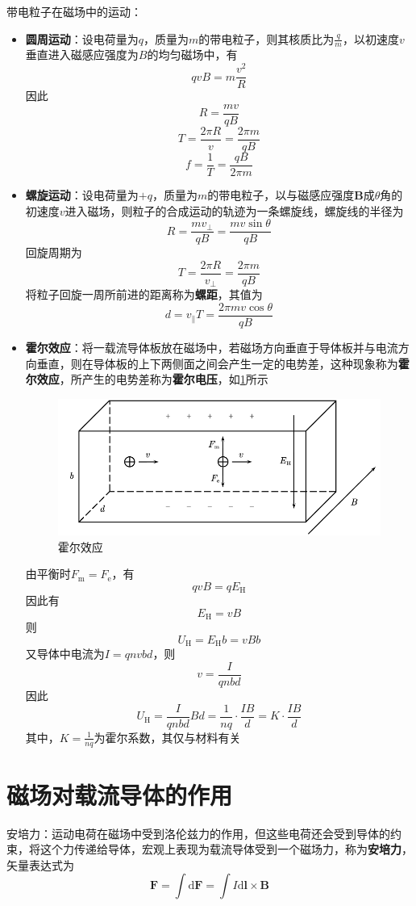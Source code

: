 \documentclass[12pt, a4paper, twoside]{ctexbook}
\begin{document}
{\sonti 带电粒子在磁场中的运动}：
\begin{itemize}
    \item \textbf{圆周运动}：设电荷量为$q$，质量为$m$的带电粒子，则其核质比为$\frac{q}{m}$，以初速度$v$垂直进入磁感应强度为$B$的均匀磁场中，有
    $$
    qvB=m\frac{v^2}{R}
    $$
    因此
    $$
    R=\frac{mv}{qB}
    $$
    $$
    T=\frac{2\pi R}{v}=\frac{2\pi m}{qB}
    $$
    $$
    f=\frac{1}{T}=\frac{qB}{2\pi m}
    $$
    \item \textbf{螺旋运动}：设电荷量为$+q$，质量为$m$的带电粒子，以与磁感应强度$\boldsymbol{B}$成$\theta$角的初速度$v$进入磁场，则粒子的合成运动的轨迹为一条螺旋线，螺旋线的半径为
    $$
    R=\frac{mv_\bot}{qB}=\frac{mv\sin\theta}{qB}
    $$
    回旋周期为
    $$
    T=\frac{2\pi R}{v_\bot}=\frac{2\pi m}{qB}
    $$
    将粒子回旋一周所前进的距离称为\textbf{螺距}，其值为
    $$
    d=v_\parallel T=\frac{2\pi mv\cos\theta}{qB}
    $$
    \item \textbf{霍尔效应}：将一载流导体板放在磁场中，若磁场方向垂直于导体板并与电流方向垂直，则在导体板的上下两侧面之间会产生一定的电势差，这种现象称为\textbf{霍尔效应}，所产生的电势差称为\textbf{霍尔电压}，如\textcolor{blue}{\cref{fig:霍尔效应}}所示
    \begin{figure}[H]
        \centerline{\includegraphics[scale=0.8]{霍尔效应}}
        \caption{霍尔效应}
        \label{fig:霍尔效应}
    \end{figure}
    由平衡时$F_\mathrm{m}=F_\mathrm{e}$，有
    $$
    qvB=qE_\mathrm{H}
    $$
    因此有
    $$
    E_\mathrm{H}=vB
    $$
    则
    $$
    U_\mathrm{H}=E_\mathrm{H}b=vBb
    $$
    又导体中电流为$I=qnvbd$，则
    $$
    v=\frac{I}{qnbd}
    $$
    因此
    $$
    U_\mathrm{H}=\frac{I}{qnbd}Bd=\frac{1}{nq}\cdot\frac{IB}{d}=K\cdot\frac{IB}{d}
    $$
    其中，$K=\frac{1}{nq}$为霍尔系数，其仅与材料有关
\end{itemize}
\section{磁场对载流导体的作用}
{\sonti 安培力}：运动电荷在磁场中受到洛伦兹力的作用，但这些电荷还会受到导体的约束，将这个力传递给导体，宏观上表现为载流导体受到一个磁场力，称为\textbf{安培力}，矢量表达式为
$$
\boldsymbol{F}=\int\mathrm{d}\boldsymbol{F}=\int I\mathrm{d}\boldsymbol{l}\times\boldsymbol{B}
$$
\end{document}
